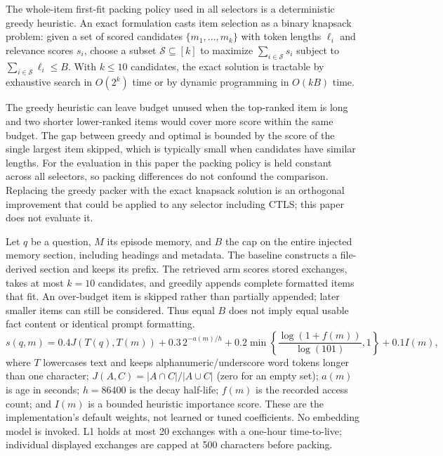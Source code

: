The whole-item first-fit packing policy used in all selectors is a deterministic greedy heuristic. An exact formulation casts item selection as a binary knapsack problem: given a set of scored candidates $\{m_1,\ldots,m_k\}$ with token lengths $\ell_i$ and relevance scores $s_i$, choose a subset $\mathcal{S} \subseteq [k]$ to maximize $\sum_{i \in \mathcal{S}} s_i$ subject to $\sum_{i \in \mathcal{S}} \ell_i \le B$. With $k \le 10$ candidates, the exact solution is tractable by exhaustive search in $O(2^k)$ time or by dynamic programming in $O(kB)$ time.

The greedy heuristic can leave budget unused when the top-ranked item is long and two shorter lower-ranked items would cover more score within the same budget. The gap between greedy and optimal is bounded by the score of the single largest item skipped, which is typically small when candidates have similar lengths. For the evaluation in this paper the packing policy is held constant across all selectors, so packing differences do not confound the comparison. Replacing the greedy packer with the exact knapsack solution is an orthogonal improvement that could be applied to any selector including CTLS; this paper does not evaluate it.

\FloatBarrier
Let $q$ be a question, $M$ its episode memory, and $B$ the cap on the entire
injected memory section, including headings and metadata. The baseline constructs
a file-derived section and keeps its prefix. The retrieved arm scores stored
exchanges, takes at most $k=10$ candidates, and greedily appends complete formatted
items that fit. An over-budget item is skipped rather than partially appended;
later smaller items can still be considered. Thus equal $B$ does not imply equal
usable fact content or identical prompt formatting.
\begin{equation}
  s(q,m)=0.4J(T(q),T(m))+0.3\,2^{-a(m)/h}
       +0.2\min\!\left\{\frac{\log(1+f(m))}{\log(101)},1\right\}+0.1I(m),
  \label{eq:ranking}
\end{equation}
where $T$ lowercases text and keeps alphanumeric/underscore word tokens longer
than one character; $J(A,C)=|A\cap C|/|A\cup C|$ (zero for an empty set);
$a(m)$ is age in seconds; $h=86400$ is the decay half-life; $f(m)$ is the recorded
access count; and $I(m)$ is a bounded heuristic importance score. These are the
implementation's default weights, not learned or tuned coefficients. No embedding
model is invoked. L1 holds at most 20 exchanges with a one-hour time-to-live;
individual displayed exchanges are capped at 500 characters before packing.

